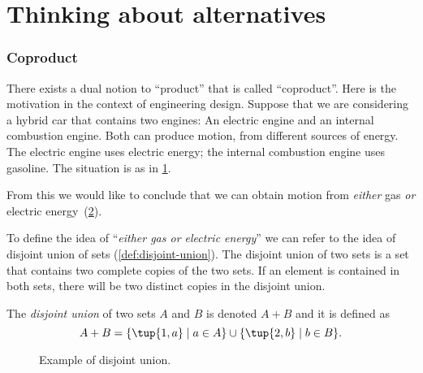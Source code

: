 \section{Thinking about alternatives}
\subsubsection{Coproduct}

There exists a dual notion to ``product'' that is called ``coproduct''. Here is the motivation in the context of engineering design.
Suppose that we are considering a hybrid car that contains two engines: An
electric engine and an internal combustion engine. Both can produce motion, from
different sources of energy. The electric engine uses electric energy; the
internal combustion engine uses gasoline. The situation is as in \cref{fig:e16a}.

\begin{figure}[h!]
    \centering
    \caption{\label{fig:e16a}}
\end{figure}

From this we would like to conclude that we can obtain motion
from \emph{either} gas \emph{or}
electric energy~(\cref{fig:e16b}).

\begin{figure}[h!]
    \centering
    \caption{\label{fig:e16b}}
\end{figure}

To define the idea of ``\emph{either gas \emph{or} electric energy}'' we can
refer to the idea of disjoint union of sets (\cref{def:disjoint-union}). The
disjoint union of two sets is a set that contains two complete copies of the two
sets. If an element is contained in both sets, there will be two distinct copies
in the disjoint union.

\begin{definition}
\label{def:disjoint-union}
    The \emph{disjoint union} of two sets $A$ and $B$ is denoted $A + B$
    and it is defined as
    \begin{equation}
        A + B=\{\tup{1,a}\mid a\in A\}\cup\{\tup{2,b}\mid b\in B\}.
    \end{equation}
\end{definition}


\begin{figure}[h!]
    \begin{center}
    \end{center}
    \caption{Example of disjoint union.}
\end{figure}


